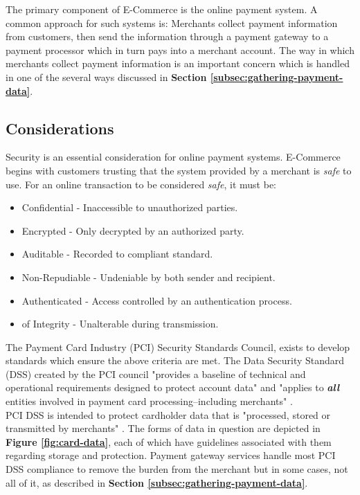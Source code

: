The primary component of E-Commerce is the online payment system. A common approach for such systems is: Merchants collect payment information from customers, then send the information through a payment gateway to a payment processor which in turn pays into a merchant account. The way in which merchants collect payment information is an important concern which is handled in one of the several ways discussed in \textbf{Section \ref{subsec:gathering-payment-data}}.

\subsection{Considerations}
\label{subsec:considerations}

Security is an essential consideration for online payment systems. E-Commerce begins with customers trusting that the system provided by a merchant is \textit{safe} to use. For an online transaction to be considered \textit{safe}, it must be:

\begin{itemize}
	  \item Confidential - Inaccessible to unauthorized parties.
    \item Encrypted - Only decrypted by an authorized party.
    \item Auditable - Recorded to compliant standard.
    \item Non-Repudiable - Undeniable by both sender and recipient.
    \item Authenticated - Access controlled by an authentication process.
    \item of Integrity - Unalterable during transmission.
\end{itemize}

The Payment Card Industry (PCI) Security Standards Council, exists to develop standards which ensure the above criteria are met. The Data Security Standard (DSS) created by the PCI council "provides a baseline of technical and operational requirements designed to protect account data" and "applies to \textit{\textbf{all}} entities involved in payment card processing--including merchants" \cite{PCI-DSS}.\\

PCI DSS is intended to protect cardholder data that is "processed, stored or transmitted by merchants" \cite{PCI-DSS}. The forms of data in question are depicted in \textbf{Figure \ref{fig:card-data}}, each of which have guidelines associated with them regarding storage and protection. Payment gateway services handle most PCI DSS compliance to remove the burden from the merchant but in some cases, not all of it, as described in \textbf{Section \ref{subsec:gathering-payment-data}}.

